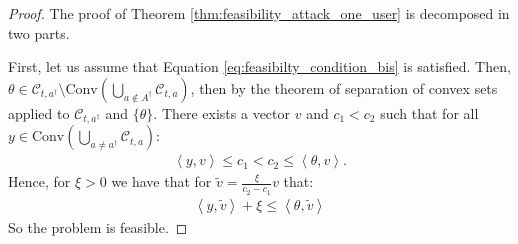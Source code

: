 \begin{proof}
The proof of Theorem \ref{thm:feasibility_attack_one_user} is decomposed in two parts. 

First, let us assume that Equation \eqref{eq:feasibilty_condition_bis} is satisfied. Then,  $\theta \in \mathcal{C}_{t,a^{\dagger}}\setminus \text{Conv}\left( \bigcup_{a\notin A^{\dagger}} \mathcal{C}_{t,a}\right) $, then by the theorem of separation of convex sets applied to $\mathcal{C}_{t,a^{\dagger}}$ and $\{ \theta \}$. There exists a vector $v$ and $c_{1}< c_{2}$ such that for all $y \in \text{Conv}\left( \bigcup_{a\neq a^{\dagger}} \mathcal{C}_{t,a}\right)$:
\begin{align*}
\left\langle y, v\right\rangle \leq c_{1} < c_{2} \leq \left\langle \theta,v\right\rangle.
\end{align*}
Hence, for $\xi>0$ we have that for $\tilde{v} = \frac{\xi}{c_{2}-c_{1}} v$ that:
\begin{align*}
    \left\langle y, \tilde{v}\right\rangle + \xi \leq \left\langle \theta, \tilde{v} \right\rangle
\end{align*}
So the problem is feasible.


\end{proof}
